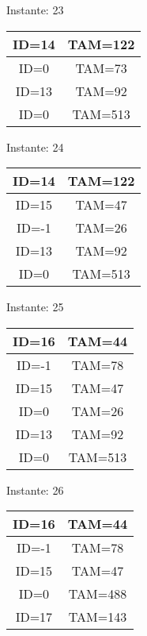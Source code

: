 \documentclass[10pt,a4paper]{article}
\begin{document}
\begin{center}

Instante: 23

\begin{tabular}{|c|c|}
\hline
ID=14 & TAM=122 \\ \hline
ID=0 & TAM=73 \\ \hline
ID=13 & TAM=92 \\ \hline
ID=0 & TAM=513 \\ \hline
\end{tabular}
\end{center}\pagebreak
\begin{center}

Instante: 24

\begin{tabular}{|c|c|}
\hline
ID=14 & TAM=122 \\ \hline
ID=15 & TAM=47 \\ \hline
ID=-1 & TAM=26 \\ \hline
ID=13 & TAM=92 \\ \hline
ID=0 & TAM=513 \\ \hline
\end{tabular}
\end{center}\pagebreak
\begin{center}

Instante: 25

\begin{tabular}{|c|c|}
\hline
ID=16 & TAM=44 \\ \hline
ID=-1 & TAM=78 \\ \hline
ID=15 & TAM=47 \\ \hline
ID=0 & TAM=26 \\ \hline
ID=13 & TAM=92 \\ \hline
ID=0 & TAM=513 \\ \hline
\end{tabular}
\end{center}\pagebreak
\begin{center}

Instante: 26

\begin{tabular}{|c|c|}
\hline
ID=16 & TAM=44 \\ \hline
ID=-1 & TAM=78 \\ \hline
ID=15 & TAM=47 \\ \hline
ID=0 & TAM=488 \\ \hline
ID=17 & TAM=143 \\ \hline
\end{tabular}
\end{center}\pagebreak
\end{document}
